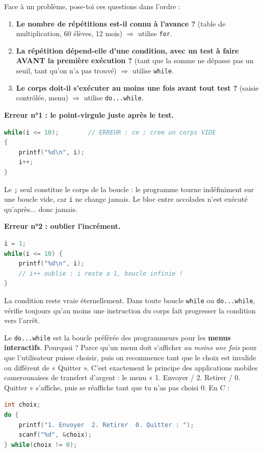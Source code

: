\documentclass[11pt]{article}
\begin{document}
\begin{methode}
Face à un problème, pose-toi ces questions dans l'ordre :
\begin{enumerate}
\item \textbf{Le nombre de répétitions est-il connu à l'avance ?} (table de multiplication, 60 élèves, 12 mois) $\Rightarrow$ utilise \texttt{for}.
\item \textbf{La répétition dépend-elle d'une condition, avec un test à faire AVANT la première exécution ?} (tant que la somme ne dépasse pas un seuil, tant qu'on n'a pas trouvé) $\Rightarrow$ utilise \texttt{while}.
\item \textbf{Le corps doit-il s'exécuter au moins une fois avant tout test ?} (saisie contrôlée, menu) $\Rightarrow$ utilise \texttt{do...while}.
\end{enumerate}
\end{methode}

\begin{attention}
\textbf{Erreur n°1 : le point-virgule juste après le test.}
\begin{lstlisting}[language=C]
while(i <= 10);        // ERREUR : ce ; cree un corps VIDE
{
    printf("%d\n", i);
    i++;
}
\end{lstlisting}
Le \texttt{;} seul constitue le corps de la boucle : le programme tourne indéfiniment sur une boucle vide, car \texttt{i} ne change jamais. Le bloc entre accolades n'est exécuté qu'après... donc jamais.

\textbf{Erreur n°2 : oublier l'incrément.}
\begin{lstlisting}[language=C]
i = 1;
while(i <= 10) {
    printf("%d\n", i);
    // i++ oublie : i reste a 1, boucle infinie !
}
\end{lstlisting}
La condition reste vraie éternellement. Dans toute boucle \texttt{while} ou \texttt{do...while}, vérifie toujours qu'au moins une instruction du corps fait progresser la condition vers l'arrêt.
\end{attention}

\begin{savaistu}
Le \texttt{do...while} est la boucle préférée des programmeurs pour les \textbf{menus interactifs}. Pourquoi ? Parce qu'un menu doit s'afficher \emph{au moins une fois} pour que l'utilisateur puisse choisir, puis on recommence tant que le choix est invalide ou différent de « Quitter ». C'est exactement le principe des applications mobiles camerounaises de transfert d'argent : le menu « 1. Envoyer / 2. Retirer / 0. Quitter » s'affiche, puis se réaffiche tant que tu n'as pas choisi 0. En C :
\begin{lstlisting}[language=C]
int choix;
do {
    printf("1. Envoyer  2. Retirer  0. Quitter : ");
    scanf("%d", &choix);
} while(choix != 0);
\end{lstlisting}
\end{savaistu}
\end{document}
